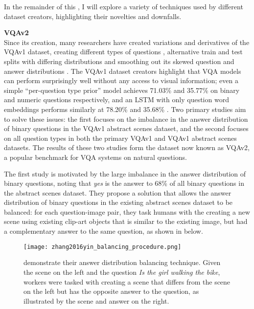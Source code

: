 In the remainder of this \subsectionautorefname, I will explore a variety of techniques used by different dataset creators, highlighting their novelties and downfalls.

\textbf{VQAv2}\\
Since its creation, many researchers have created variations and derivatives of the VQAv1 dataset, creating different types of questions \cite{agrawal2017cvqa}, alternative train and test splits with differing distributions \cite{agrawal2018dont} and smoothing out its skewed question and answer distributions \cite{zhang2016yin, goyal2017making}. The VQAv1 dataset creators highlight that VQA models can perform surprisingly well without any access to visual information; even a simple ``per-question type prior'' model achieves 71.03\% and 35.77\% on binary and numeric questions respectively, and an LSTM with only question word embeddings performs similarly at 78.20\% and 35.68\% \cite{antol2015vqa}. Two primary studies aim to solve these issues: the first \cite{zhang2016yin} focuses on the imbalance in the answer distribution of binary questions in the VQAv1 abstract scenes dataset, and the second \cite{goyal2017making} focuses on all question types in both the primary VQAv1 and VQAv1 abstract scenes datasets. The results of these two studies form the dataset now known as VQAv2, a popular benchmark for VQA systems on natural questions.

The first study is motivated by the large imbalance in the answer distribution of binary questions, noting that \textit{yes} is the answer to 68\% of all binary questions in the abstract scenes dataset. They propose a solution that allows the answer distribution of binary questions in the existing abstract scenes dataset to be balanced: for each question-image pair, they task humans with the creating a new scene using existing clip-art objects \cite{zitnick2013bringing} that is similar to the existing image, but had a complementary answer to the same question, as shown in \figureautorefname{  \ref{fig:zhang2016yin_balancing_procedure}} below.

\begin{figure}[H]
    \centering
    \texttt{[image: zhang2016yin\_balancing\_procedure.png]}
    \caption[A Technique for balancing answers to binary questions \cite{zhang2016yin}]{\citeauthor{zhang2016yin} \cite{zhang2016yin} demonstrate their answer distribution balancing technique. Given the scene on the left and the question \textit{Is the girl walking the bike}, workers were tasked with creating a scene that differs from the scene on the left but has the opposite answer to the question, as illustrated by the scene and answer on the right.}
    \label{fig:zhang2016yin_balancing_procedure}
\end{figure}

